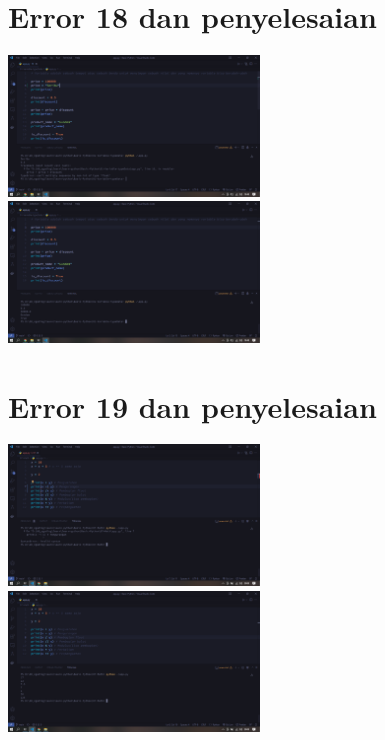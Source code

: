 \documentclass{article}
\begin{document}
\section{Error 18 dan penyelesaian}
\includegraphics[width=0.5\textwidth]{gambar/02_error.png}
\includegraphics[width=0.5\textwidth]{gambar/02_penanganan.png}

\section{Error 19 dan penyelesaian}
\includegraphics[width=0.5\textwidth]{gambar/08_error.png}
\includegraphics[width=0.5\textwidth]{gambar/08_penanganan.png}
\end{document}
